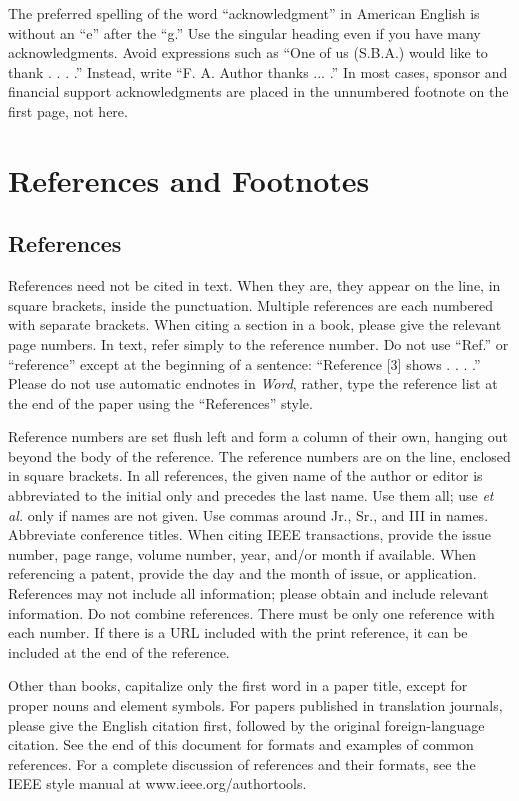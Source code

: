 \documentclass[journal]{IEEEtran}
\begin{document}
The preferred spelling of the word ``acknowledgment'' in American English is without an ``e'' after the ``g.'' Use the singular heading even if you have many acknowledgments. Avoid expressions such as ``One of us (S.B.A.) would like to thank . . . .'' Instead, write “F. A. Author thanks ... .” In most cases, sponsor and financial support acknowledgments are placed in the unnumbered footnote on the first page, not here.

\section*{References and Footnotes}

\subsection{References}

References need not be cited in text. When they are, they appear on the line, in square brackets, inside the punctuation.  Multiple references are each numbered with separate brackets. When citing a section in a book, please give the relevant page numbers. In text, refer simply to the reference number. Do not use ``Ref.'' or ``reference'' except at the beginning of a sentence: ``Reference [3] shows . . . .'' Please do not use automatic endnotes in {\em Word}, rather, type the reference list at the end of the paper using the ``References'' style.

Reference numbers are set flush left and form a column of their own, hanging out beyond the body of the reference. The reference numbers are on the line, enclosed in square brackets. In all references, the given name of the author or editor is abbreviated to the initial only and precedes the last name. Use them all; use {\em et al.} only if names are not given. Use commas around Jr., Sr., and III in names. Abbreviate conference titles.  When citing IEEE transactions, provide the issue number, page range, volume number, year, and/or month if available. When referencing a patent, provide the day and the month of issue, or application. References may not include all information; please obtain and include relevant information. Do not combine references. There must be only one reference with each number. If there is a URL included with the print reference, it can be included at the end of the reference.

Other than books, capitalize only the first word in a paper title, except for proper nouns and element symbols. For papers published in translation journals, please give the English citation first, followed by the original foreign-language citation. See the end of this document for formats and examples of common references. For a complete discussion of references and their formats, see the IEEE style manual at www.ieee.org/authortools.
\end{document}
